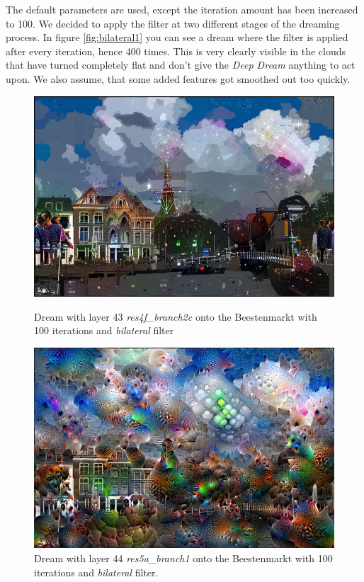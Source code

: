 The default parameters are used, except the  iteration amount has been increased to 100.
We decided to apply the filter at two different stages of the dreaming process.
In figure \ref{fig:bilateral1} you can see a dream where the filter is applied after every iteration, hence 400 times.
This is very clearly visible in the clouds that have turned completely flat and don't give the \emph{Deep Dream} anything to act upon. 
We also assume, that some added features got smoothed out too quickly.


\begin{figure}[H]
	\centering
	\includegraphics[width=1\linewidth]{img/bilateral1.jpg}
	\caption{Dream with layer 43 \emph{res4f\_branch2c} onto the Beestenmarkt with 100 iterations and \emph{bilateral} filter}
	\label{fig:bilateral1}
	\endminipage\hfill
	\centering
	\includegraphics[width=1\linewidth]{img/beestenmarkt_res5a_branch1_bilateral.jpg}
	\caption{Dream with layer 44 \emph{res5a\_branch1} onto the Beestenmarkt with 100 iterations and \emph{bilateral} filter.}
	\label{fig:bilateral2}
	\endminipage\hfill
\end{figure}
\newpage

